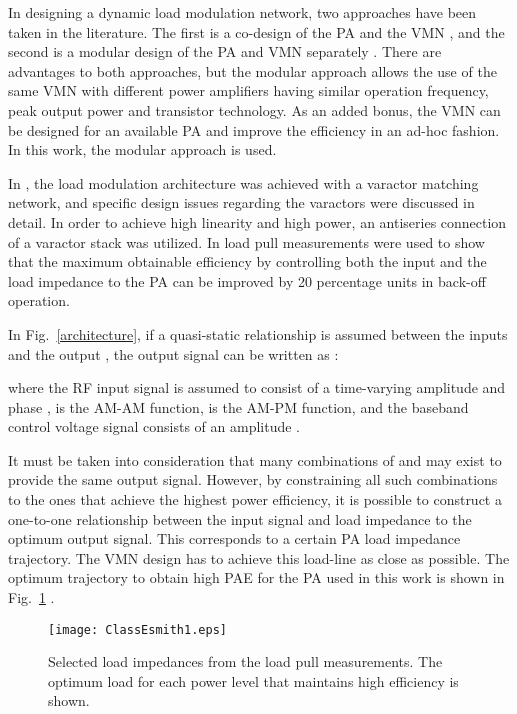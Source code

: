 \documentclass[10pt,journal]{IEEEtran}
\begin{document}
In designing a dynamic load modulation network, two approaches have been taken in the literature. The first is a co-design of the PA and the VMN \cite{fuMTT}, and the second is a modular design of the PA and VMN separately \cite{hosseinMTT}. There are advantages to both approaches, but the modular approach allows the use of the same VMN with different power amplifiers having similar operation frequency, peak output power and transistor technology. As an added bonus, the VMN can be designed for an available PA and improve the efficiency in an ad-hoc fashion. In this work, the modular approach is used.

In \cite{hosseinMTT}, the load modulation architecture was achieved with a varactor matching network, and specific design issues regarding the varactors were discussed in detail. In order to achieve high linearity and high power, an antiseries connection of a varactor stack was utilized. In \cite{hosseinEMW} load pull measurements were used to show that the maximum obtainable efficiency by controlling both the input and the load impedance to the PA can be improved by 20 percentage units in back-off operation.

In Fig.~\ref{architecture}, if a quasi-static relationship is assumed between the inputs  and the output , the output signal can be written as \cite{soltani}:

where the RF input signal  is assumed to consist of a time-varying amplitude  and phase ,  is the AM-AM function,  is the AM-PM function, and the baseband control voltage signal consists of an amplitude .

It must be taken into consideration that many combinations of  and  may exist to provide the same output signal. However, by constraining all such combinations to the ones that achieve the highest power efficiency, it is possible to construct a one-to-one relationship between the input signal and load impedance to the optimum output signal. This corresponds to a certain PA load impedance trajectory. The VMN design has to achieve this load-line as close as possible. The optimum trajectory to obtain high PAE for the PA used in this work is shown in Fig.~\ref{classEsmith} \cite{hosseinMTT}.

\begin{figure}
\centering
\texttt{[image: ClassEsmith1.eps]}
\caption{Selected load impedances from the load pull measurements. The optimum load for each power level that maintains high efficiency is shown.}
\label{classEsmith}
\end{figure}
\end{document}
